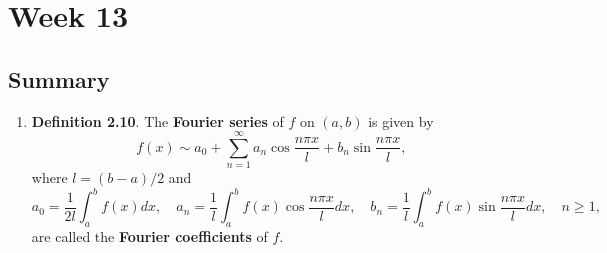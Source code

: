 \chapter{Week 13}
\setcounter{weekpage}{1}
\thispagestyle{plainweek}

\section{Summary}

\begin{enumerate}


\item \textbf{Definition 2.10}.  The \textbf{Fourier series}  of $f$ on $(a, b)$ is given by
\[f(x) \sim a_{0}+\sum_{n=1}^{\infty}a_{n}\cos \frac{n\pi x}{l} + b_{n}\sin \frac{n\pi x}{l},\]
where $l=(b-a)/2$ and
\[a_{0} = \frac{1}{2l}\int_{a}^{b}f(x)dx, \quad a_{n} = \frac{1}{l}\int_{a}^{b}f(x)\cos\frac{n\pi x}{l}dx,\quad b_{n} = \frac{1}{l}\int_{a}^{b}f(x)\sin\frac{n\pi x}{l}dx,\quad n\geq 1,\]
are called the \textbf{Fourier coefficients} of $f$.





\end{enumerate}
